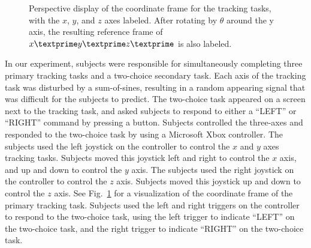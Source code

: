 \begin{figure}[b!]
\begin{center}

        \caption{Perspective display of the coordinate frame for the tracking tasks, with the $x$, $y$, and $z$ axes labeled. After rotating by $\theta$ around the y axis, the resulting reference frame of $x\textprime y\textprime z\textprime$ is also labeled.}
        \label{designdiagram}
    \end{center}
\end{figure}

In our experiment, subjects were responsible for simultaneously completing three primary tracking tasks and a two-choice secondary task.
Each axis of the tracking task was disturbed by a sum-of-sines, resulting in a random appearing signal that was difficult for the subjects to predict.
The two-choice task appeared on a screen next to the tracking task, and asked subjects to respond to either a ``LEFT'' or ``RIGHT'' command by pressing a button.
Subjects controlled the three-axes and responded to the two-choice task by using a Microsoft Xbox controller.
The subjects used the left joystick on the controller to control the $x$ and $y$ axes tracking tasks.
Subjects moved this joystick left and right to control the $x$ axis, and up and down to control the $y$ axis.
The subjects used the right joystick on the controller to control the $z$ axis.
Subjects moved this joystick up and down to control the $z$ axis.
See Fig.~\ref{designdiagram} for a visualization of the coordinate frame of the primary tracking task.
Subjects used the left and right triggers on the controller to respond to the two-choice task, using the left trigger to indicate ``LEFT'' on the two-choice task, and the right trigger to indicate ``RIGHT'' on the two-choice task.

